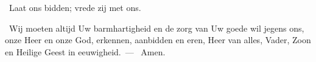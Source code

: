 \documentclass[12pt,twoside,a5paper]{article}
\begin{document}
\begin{halfparskip}
   \dd~Laat ons bidden; vrede zij met ons.

  \cc~Wij moeten altijd Uw barmhartigheid en de zorg van Uw goede wil jegens ons, onze Heer en onze God, erkennen, aanbidden en eren, Heer van alles, Vader, Zoon en Heilige Geest in eeuwigheid.~--- \rr~Amen.
\end{halfparskip}



\end{document}
